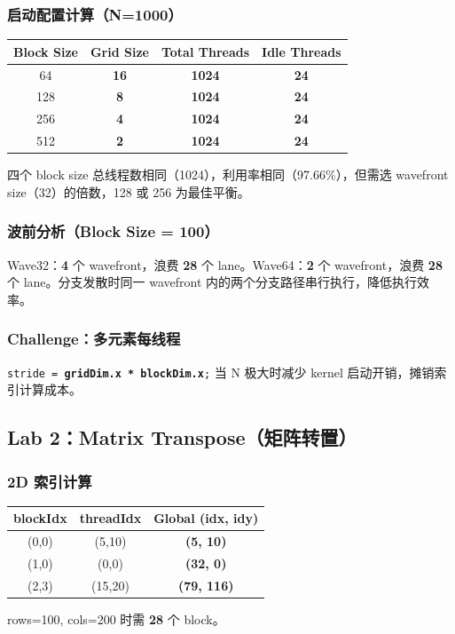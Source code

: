 \documentclass[12pt,a4paper]{article}
\newcommand{\ans}[1]{\textcolor{answerblue}{\textbf{#1}}}
\begin{document}
\subsubsection*{启动配置计算（N=1000）}
\begin{table}[H]
\centering
\begin{tabular}{cccc}
\toprule
Block Size & Grid Size & Total Threads & Idle Threads \\
\midrule
64  & \ans{16} & \ans{1024} & \ans{24} \\
128 & \ans{8}  & \ans{1024} & \ans{24} \\
256 & \ans{4}  & \ans{1024} & \ans{24} \\
512 & \ans{2}  & \ans{1024} & \ans{24} \\
\bottomrule
\end{tabular}
\end{table}
四个 block size 总线程数相同（1024），利用率相同（97.66\%），但需选 wavefront size（32）的倍数，128 或 256 为最佳平衡。

\subsubsection*{波前分析（Block Size = 100）}
Wave32：\ans{4} 个 wavefront，浪费 \ans{28} 个 lane。Wave64：\ans{2} 个 wavefront，浪费 \ans{28} 个 lane。分支发散时同一 wavefront 内的两个分支路径串行执行，降低执行效率。

\subsubsection*{Challenge：多元素每线程}
\texttt{stride = \ans{gridDim.x * blockDim.x};} 当 N 极大时减少 kernel 启动开销，摊销索引计算成本。

\subsection{Lab 2：Matrix Transpose（矩阵转置）}

\subsubsection*{2D 索引计算}
\begin{table}[H]
\centering
\begin{tabular}{ccc}
\toprule
blockIdx & threadIdx & Global (idx, idy) \\
\midrule
(0,0) & (5,10)  & \ans{(5, 10)} \\
(1,0) & (0,0)   & \ans{(32, 0)} \\
(2,3) & (15,20) & \ans{(79, 116)} \\
\bottomrule
\end{tabular}
\end{table}
rows=100, cols=200 时需 \ans{28} 个 block。
\end{document}
